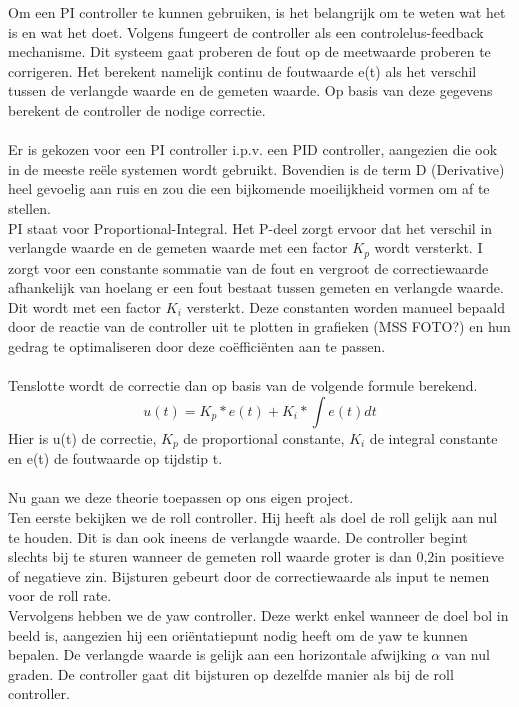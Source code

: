 \noindent
Om een PI controller te kunnen gebruiken, is het belangrijk om te weten wat het is en wat het doet. Volgens \cite{website:PIDController} fungeert de controller als een controlelus-feedback mechanisme. Dit systeem gaat proberen de fout op de meetwaarde proberen te corrigeren. Het berekent namelijk continu de foutwaarde e(t) als het verschil tussen de verlangde waarde en de gemeten waarde. Op basis van deze gegevens berekent de controller de nodige correctie.
\\
\\
Er is gekozen voor een PI controller i.p.v. een PID controller, aangezien die ook in de meeste re\"ele systemen wordt gebruikt. Bovendien is de term D (Derivative) heel gevoelig aan ruis en zou die een bijkomende moeilijkheid vormen om af te stellen.
\\
PI staat voor Proportional-Integral. Het P-deel zorgt ervoor dat het verschil in verlangde waarde en de gemeten waarde met een factor $K_p$ wordt versterkt. 
I zorgt voor een constante sommatie van de fout en vergroot de correctiewaarde afhankelijk van hoelang er een fout bestaat tussen gemeten en verlangde waarde. Dit wordt met een factor $K_i$ versterkt. Deze constanten worden manueel bepaald door de reactie van de controller uit te plotten in grafieken (MSS FOTO?) en hun gedrag te optimaliseren door deze co\"effici\"enten aan te passen.
\\
\\
Tenslotte wordt de correctie dan op basis van de volgende formule berekend.
\begin{equation}
	u(t) = K_p * e(t) + K_i * \int e(t) dt
\end{equation}
Hier is u(t) de correctie, $K_p$ de proportional constante, $K_i$ de integral constante en e(t) de foutwaarde op tijdstip t.
\\
\\
Nu gaan we deze theorie toepassen op ons eigen project.
\\
Ten eerste bekijken we de roll controller. Hij heeft als doel de roll gelijk aan nul te houden. Dit is dan ook ineens de verlangde waarde. De controller begint slechts bij te sturen wanneer de gemeten roll waarde groter is dan 0,2\degree in positieve of negatieve zin. Bijsturen gebeurt door de correctiewaarde als input te nemen voor de roll rate.
\\
Vervolgens hebben we de yaw controller. Deze werkt enkel wanneer de doel bol in beeld is, aangezien hij een ori\"entatiepunt nodig heeft om de yaw te kunnen bepalen. De verlangde waarde is gelijk aan een horizontale afwijking $\alpha$ van nul graden. De controller gaat dit bijsturen op dezelfde manier als bij de roll controller.
